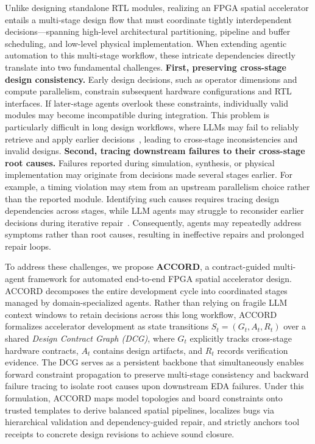 \documentclass[conference]{IEEEtran}
\begin{document}
Unlike designing standalone RTL modules, realizing an FPGA spatial accelerator entails a multi-stage design flow that must coordinate tightly interdependent decisions—spanning high-level architectural partitioning, pipeline and buffer scheduling, and low-level physical implementation.
When extending agentic automation to this multi-stage workflow, these intricate dependencies directly translate into two fundamental challenges. \textbf{First, preserving cross-stage design consistency.}
Early design decisions, such as operator dimensions and compute parallelism, constrain subsequent hardware configurations and RTL interfaces. If later-stage agents overlook these constraints, individually valid modules may become incompatible during integration. This problem is particularly difficult in long design workflows, where LLMs may fail to reliably retrieve and apply earlier decisions~\cite{lostmiddle,longbench,locomo}, leading to cross-stage inconsistencies and invalid designs.
\textbf{Second, tracing downstream failures to their cross-stage root causes.}
Failures reported during simulation, synthesis, or physical implementation may originate from decisions made several stages earlier. For example, a timing violation may stem from an upstream parallelism choice rather than the reported module. Identifying such causes requires tracing design dependencies across stages, while LLM agents may struggle to reconsider earlier decisions during iterative repair~\cite{swesearch}. Consequently, agents may repeatedly address symptoms rather than root causes, resulting in ineffective repairs and prolonged repair loops.

To address these challenges, we propose \textbf{ACCORD}, a contract-guided multi-agent framework for automated end-to-end FPGA spatial accelerator design. ACCORD decomposes the entire development cycle into coordinated stages managed by domain-specialized agents. Rather than relying on fragile LLM context windows to retain decisions across this long workflow, ACCORD formalizes accelerator development as state transitions $S_t = (G_t, A_t, R_t)$ over a shared \emph{Design Contract Graph (DCG)}, where $G_t$ explicitly tracks cross-stage hardware contracts, $A_t$ contains design artifacts, and $R_t$ records verification evidence. The DCG serves as a persistent backbone that simultaneously enables forward constraint propagation to preserve multi-stage consistency and backward failure tracing to isolate root causes upon downstream EDA failures. Under this formulation, ACCORD maps model topologies and board constraints onto trusted templates to derive balanced spatial pipelines, localizes bugs via hierarchical validation and dependency-guided repair, and strictly anchors tool receipts to concrete design revisions to achieve sound closure.
\end{document}
